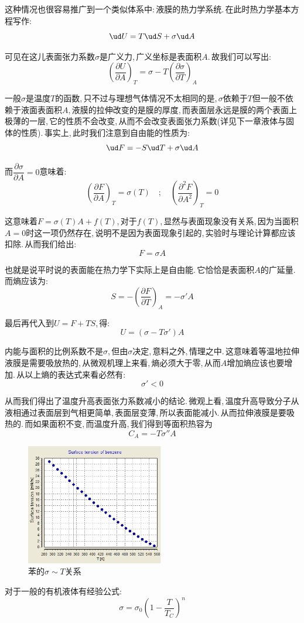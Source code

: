 这种情况也很容易推广到一个类似体系中:\,液膜的热力学系统.\,在此时热力学基本方程写作:
\[\ud U=T\ud S+\sigma \ud A\]

可见在这儿表面张力系数$\sigma$是广义力,\,广义坐标是表面积$A$.\,故我们可以写出:
\[\left(\frac{\partial U}{\partial A}\right)_T=\sigma-T\left(\frac{\partial \sigma}{\partial T}\right)_A\]

一般$\sigma$是温度$T$的函数,\,只不过与理想气体情况不太相同的是,\,$\sigma$依赖于$T$但一般不依赖于液面表面积$A$,\,液膜的拉伸改变的是膜的厚度,\,而表面层永远是膜的两个表面上极薄的一层,\,它的性质不会改变,\,从而不会改变表面张力系数(详见下一章液体与固体的性质).\,事实上,\,此时我们注意到自由能的性质为:
\[\ud F=-S\ud T+\sigma \ud A\]

而$\dfrac{\partial \sigma}{\partial A}=0$意味着:
\[\left(\frac{\partial F}{\partial A}\right)_T=\sigma(T) \quad;\quad \left(\frac{\partial^2 F}{\partial A^2}\right)_T=0\]

这意味着$F=\sigma(T)A+f(T)$,\,对于$f(T)$,\,显然与表面现象没有关系,\,因为当面积$A=0$时这一项仍然存在,\,说明不是因为表面现象引起的,\,实验时与理论计算都应该扣除.\,从而我们给出:
\[F=\sigma A\]

也就是说平时说的表面能在热力学下实际上是自由能.\,它恰恰是表面积$A$的广延量.\,而熵应该为:
\[S=-\left(\frac{\partial F}{\partial T}\right)_A=-\sigma'A\]

最后再代入到$U=F+TS$,\,得:
\[U=(\sigma-T\sigma')A\]

内能与面积的比例系数不是$\sigma$,\,但由$\sigma$决定,\,意料之外,\,情理之中.\,这意味着等温地拉伸液膜是需要吸放热的,\,从微观机理上来看,\,熵必须大于零,\,从而$A$增加熵应该也要增加.\,从以上熵的表达式来看必然有:
\[\sigma'<0\]

从而我们得出了温度升高表面张力系数减小的结论.\,微观上看,\,温度升高导致分子从液相通过表面层到气相更简单,\,表面层变薄,\,所以表面能减小.\,从而拉伸液膜是要吸热的.\,而如果面积不变,\,而温度升高,\,我们得到等面积热容为
\[C_A=-T\sigma'' A\]

\begin{figure}
\centering
\vspace{-0.3cm}
\includegraphics[width=6cm]{image/5-2-19.png}
\caption{苯的$\sigma\sim T$关系}
\end{figure}
对于一般的有机液体有经验公式:
\[\sigma=\sigma_0(1-\frac{T}{T_C})^n\]

